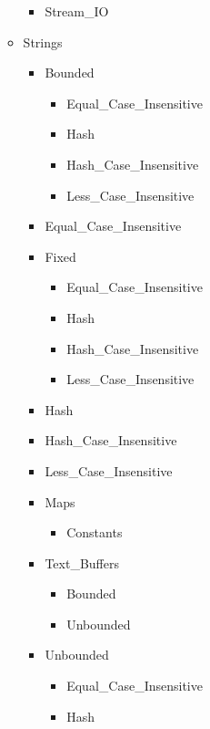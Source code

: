 \documentclass[english]{article}
\begin{document}
\begin{scriptsize}
\begin{multicols*}{5}
\begin{itemize}[leftmargin=0mm]
\begin{itemize}[leftmargin=5mm]
\begin{itemize}[leftmargin=5mm]
            \item[] Stream\_IO
         \end{itemize}
      \item[] Strings
         \begin{itemize}[leftmargin=5mm]
            \item[] Bounded
            \begin{itemize}[leftmargin=5mm]
               \item[] Equal\_Case\_Insensitive
               \item[] Hash
               \item[] Hash\_Case\_Insensitive
               \item[] Less\_Case\_Insensitive
            \end{itemize}
            \item[] Equal\_Case\_Insensitive
            \item[] Fixed
            \begin{itemize}[leftmargin=5mm]
               \item[] Equal\_Case\_Insensitive
               \item[] Hash
               \item[] Hash\_Case\_Insensitive
               \item[] Less\_Case\_Insensitive
            \end{itemize}
            \item[] Hash
            \item[] Hash\_Case\_Insensitive
            \item[] Less\_Case\_Insensitive
            \item[] Maps
            \begin{itemize}[leftmargin=5mm]
               \item[] Constants
            \end{itemize}
            \item[] Text\_Buffers
            \begin{itemize}[leftmargin=5mm]
               \item[] Bounded
               \item[] Unbounded
            \end{itemize}
            \item[] Unbounded
            \begin{itemize}[leftmargin=5mm]
               \item[] Equal\_Case\_Insensitive
               \item[] Hash

\end{itemize}
\end{itemize}
\end{itemize}
\end{itemize}
\end{multicols*}
\end{scriptsize}
\end{document}
